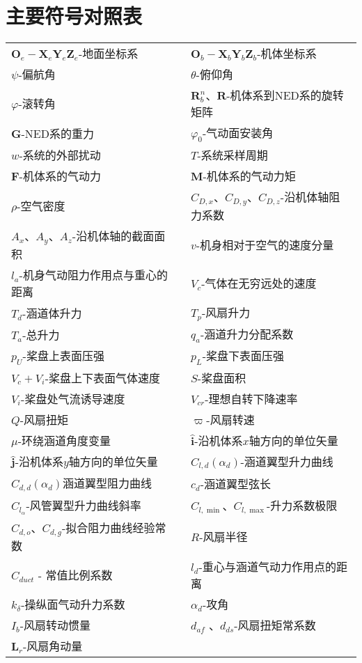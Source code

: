 \chapter{主要符号对照表}

\begin{table}
	\centering{}%
	\begin{tabular}{l>{\centering}p{0.5cm}l}
	 $ \boldsymbol{O}_e-\boldsymbol{X}_e\boldsymbol{Y}_e\boldsymbol{Z}_e $-地面坐标系           &  & ${\boldsymbol{O}_b}-{\boldsymbol{X}_b}{\boldsymbol{Y}_b}{\boldsymbol{Z}_b}$-机体坐标系\tabularnewline
	 $ \psi $-偏航角								   &  & $\theta$-俯仰角\tabularnewline
	 $\varphi$-滚转角  							   &  & $\boldsymbol{R}^n_b$、$\boldsymbol{R}$-机体系到NED系的旋转矩阵\tabularnewline
	 $\boldsymbol{G}$-NED系的重力  							  &  &   $\varphi_0 $-气动面安装角\tabularnewline
	 $ w $-系统的外部扰动								&  &  $T$-系统采样周期\tabularnewline
	 $\boldsymbol{F}$-机体系的气动力 						    &  &   $\boldsymbol{M}$-机体系的气动力矩\tabularnewline
	 $\rho$-空气密度 								  &  &  $C_{D,x} $、$ C_{D,y} $、$ C_{D,z} $-沿机体轴阻力系数\tabularnewline
	 $A_x $、$ A_y $、$ A_z $-沿机体轴的截面面积 		 &  &  $v$-机身相对于空气的速度分量\tabularnewline 
	 $l_{a}$-机身气动阻力作用点与重心的距离   			  &  &  $V_c$-气体在无穷远处的速度\tabularnewline
	 $T_d$-涵道体升力  								 &  &  $T_p$-风扇升力\tabularnewline
	 $T_a$-总升力 								      &  &  $q_a$-涵道升力分配系数\tabularnewline
	 $ p_U $-桨盘上表面压强 						   &  &  $p_L$-桨盘下表面压强\tabularnewline
	 $V_c+V_i$-桨盘上下表面气体速度 					 &  &  $S$-桨盘面积\tabularnewline
	 $ V_i $-桨盘处气流诱导速度 						  &  &  $ V_{cr} $-理想自转下降速率\tabularnewline
	 $ Q $-风扇扭矩 								 &  &  $ \varpi $-风扇转速\tabularnewline
	 $\mu$-环绕涵道角度变量 						  &  &  $\hat{\boldsymbol{i}}$-沿机体系$x$轴方向的单位矢量\tabularnewline 
	 $\hat{\boldsymbol{j}}$-沿机体系$y$轴方向的单位矢量  	   &  &  $C_{l, d}(\alpha_d)$-涵道翼型升力曲线\tabularnewline 
	 $C_{d, d}(\alpha_d)$涵道翼型阻力曲线  		      &  &  $c_d$-涵道翼型弦长\tabularnewline 
	 $C_{l_{\alpha}}$-风管翼型升力曲线斜率  			 &  &  $C_{l, \min }$、$ C_{l, \max } $-升力系数极限\tabularnewline 
	 $C_{d, o }$、$C_{d, g }$-拟合阻力曲线经验常数 	&  &  $R$-风扇半径\tabularnewline 
	 $C_{d u c t}$ - 常值比例系数  					&  &  $l_{d}$-重心与涵道气动力作用点的距离\tabularnewline
	 $k_{\delta}$-操纵面气动升力系数 				 &  &  $\alpha_d$-攻角\tabularnewline
	 $ I_{b}$-风扇转动惯量  						   &  &  $ d_{af} $ 、$ d_{ds} $-风扇扭矩常系数\tabularnewline
	 $\boldsymbol{L}_{{r}}$-风扇角动量  						&  & \tabularnewline 					
	\end{tabular}
\end{table}